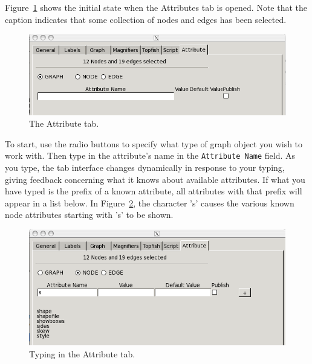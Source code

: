 Figure~\ref{fig:attr1} shows the initial state when the Attributes tab is opened.
Note that the caption indicates that some collection of nodes and edges has been selected.
	\begin{figure}[ht]
	\begin{center}
	\includegraphics[scale=.5]{figures/attr1.png}
\caption{\small The Attribute tab.}
\label{fig:attr1}
\end{center}
\end{figure}
To start, use the radio buttons to specify what type of 
graph object you wish to work with. Then type in the attribute's name in the
{\tt Attribute Name} field. As you type, the tab interface changes dynamically in
response to your typing,
giving feedback concerning what it knows about available attributes. If what you have
typed is the prefix of a known attribute, all attributes with that prefix will appear
in a list below. In Figure~\ref{fig:attr2}, the character 's' causes the various
known node attributes starting with 's' to be shown.
\begin{figure}[ht]
\begin{center}
\includegraphics[scale=.5]{figures/attr2.png}
\caption{\small Typing in the Attribute tab.}
\label{fig:attr2}
\end{center}
\end{figure}

